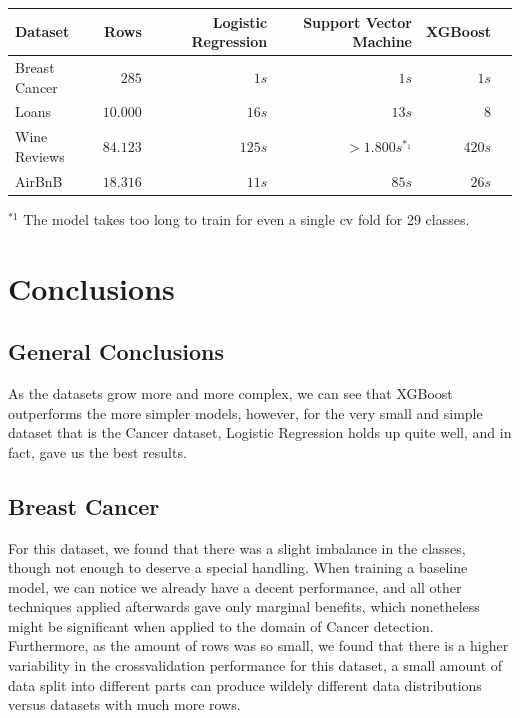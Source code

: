 \documentclass[12pt,a4paper]{article}
\begin{document}
\begin{table}[h]
\centering
\label{tab:Efficiency_table}
\begin{tabular}{lrrrrr}
    \toprule
        Dataset & Rows & Logistic Regression & Support Vector Machine & XGBoost \\
        \midrule
        Breast Cancer & $285$ & $1s$ & $1s$ & $1s$ \\
        Loans & $10.000$ & $16s$ & $13s$ & $8$ \\
        Wine Reviews & $84.123$ & $125s$ & $>1.800s^{*_1}$ & $420s$ \\
        AirBnB & $18.316$ & $11s$ & $85s$ & $26s$ \\
        \bottomrule
    \end{tabular}
\end{table}
$^{*1}$ The model takes too long to train for even a single cv fold for 29 classes.

\vspace{1.0cm}

\section{Conclusions}
\label{sec:Conclusions}
\subsection{General Conclusions}
As the datasets grow more and more complex, we can see that XGBoost outperforms the more simpler models, however, for the very small and simple dataset that is the Cancer dataset, Logistic Regression holds up quite well, and in fact, gave us the best results.

\vspace{0.5cm}

\subsection{Breast Cancer}
For this dataset, we found that there was a slight imbalance in the classes, though not enough to deserve a special handling. When training a baseline model, we can notice we already have a decent performance, and all other techniques applied afterwards gave only marginal benefits, which nonetheless might be significant when applied to the domain of Cancer detection.
Furthermore, as the amount of rows was so small, we found that there is a higher variability in the crossvalidation performance for this dataset, a small amount of data split into different parts can produce wildely different data distributions versus datasets with much more rows.
\end{document}
